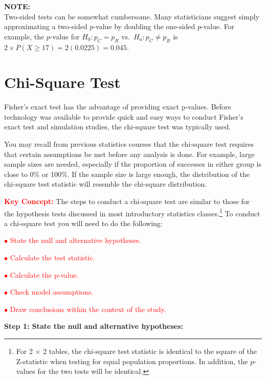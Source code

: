 \documentclass[
]{report}
\begin{document}
\large

\textbf{NOTE:}\\
Two-sided tests can be somewhat cumbersome. Many statisticians suggest simply approximating a two-sided \(p\)-value by doubling the one-sided \(p\)-value. For example, the \(p\)-value for \(H_0: p_C = p_R\) vs.~\(H_a: p_C \neq p_R\) is \(2 \times P(X \ge 17) = 2(0.0225) = 0.045\).\\
\normalsize

\hypertarget{chi-square-test}{%
\section{\texorpdfstring{\textbf{Chi-Square Test}}{Chi-Square Test}}\label{chi-square-test}}

Fisher's exact test has the advantage of providing exact p-values. Before technology was available to provide
quick and easy ways to conduct Fisher's exact test and simulation studies, the chi-square test was typically
used.

You may recall from previous statistics courses that the chi-square test requires that certain assumptions
be met before any analysis is done. For example, large sample sizes are needed, especially if the proportion
of successes in either group is close to 0\% or 100\%. If the sample size is large enough, the distribution of the
chi-square test statistic will resemble the chi-square distribution.

\Large

\textbf{\textcolor{red}{Key Concept:}}
The steps to conduct a chi-square test are similar to those for the hypothesis tests discussed in most introductory statistics classes.\footnote{For 2 × 2 tables, the chi-square test statistic is identical to the square of the Z-statistic when testing for equal population proportions. In addition, the \(p\)-values for the two tests will be identical.} To conduct a chi-square test you will need to do the following:

\textcolor{red}{$\bullet$ State the null and alternative hypotheses.}

\textcolor{red}{$\bullet$ Calculate the test statistic.}

\textcolor{red}{$\bullet$ Calculate the p-value.}

\textcolor{red}{$\bullet$ Check model assumptions.}

\textcolor{red}{$\bullet$ Draw conclusions within the context of the study.}
\normalsize

\textbf{Step 1: State the null and alternative hypotheses:}
\end{document}

